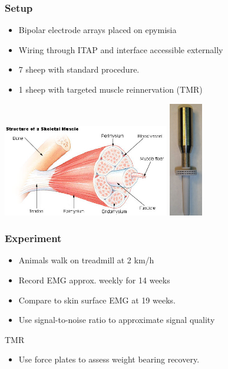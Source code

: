 \begin{frame}
    \frametitle{Setup}

    \begin{itemize}
        \item Bipolar electrode arrays placed on epymisia
        \item Wiring through ITAP and interface accessible externally
        \item 7 sheep with standard procedure.
        \item 1 sheep with targeted muscle reinnervation (TMR)
    \end{itemize}

    \includegraphics[height=4cm]{figures/epymisium.jpg}
    \includegraphics[height=5cm]{figures/round-flange.png}
\end{frame}

\begin{frame}
    \frametitle{Experiment}

    \begin{itemize}
        \item Animals walk on treadmill at 2 km/h
        \item Record EMG approx. weekly for 14 weeks
        \item Compare to skin surface EMG at 19 weeks.
        \item Use signal-to-noise ratio to approximate signal quality
    \end{itemize}
    TMR
    \begin{itemize}
        \item Use force plates to assess weight bearing recovery.
    \end{itemize}
\end{frame}


